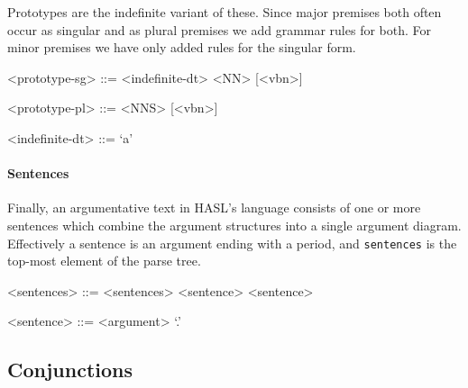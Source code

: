 \noindent Prototypes are the indefinite variant of these. Since major premises both often occur as singular and as plural premises we add grammar rules for both. For minor premises we have only added rules for the singular form.

\begin{grammar}
<prototype-sg> ::= <indefinite-dt> <NN> [<vbn>]

<prototype-pl> ::= <NNS> [<vbn>]

<indefinite-dt> ::= `a'
\end{grammar}

\paragraph{Sentences} Finally, an argumentative text in HASL's language consists of one or more sentences which combine the argument structures into a single argument diagram. Effectively a sentence is an argument ending with a period, and \texttt{sentences} is the top-most element of the parse tree.

\begin{grammar}
<sentences> ::= <sentences> <sentence>
    \alt <sentence>

<sentence> ::= <argument> `.'
\end{grammar}

\subsection{Conjunctions}

